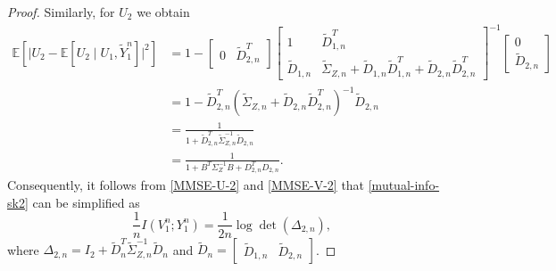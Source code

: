 \documentclass[12pt]{article}
\newcommand{\E}{\mathbb{E}}
\begin{document}
\begin{proof}
Similarly, for $U_2$ we obtain
\begin{equation}\label{MMSE-V-2}
\begin{aligned}
\E[\vert U_2-\E[U_2\mid U_1, \widetilde{Y}_1^n]\vert^2] &= 1 - \begin{bmatrix}0 & \widetilde{D}^T_{2,n}\end{bmatrix} \begin{bmatrix}1 & \widetilde{D}_{1,n}^T\\[2pt] \widetilde{D}_{1,n} & \widetilde{\Sigma}_{Z,n}+\widetilde{D}_{1,n}\widetilde{D}_{1,n}^T+\widetilde{D}_{2,n}\widetilde{D}_{2,n}^T\end{bmatrix}^{-1} \begin{bmatrix}
   0\\ \widetilde{D}_{2,n}
\end{bmatrix}        \\
&= 1 -   \widetilde{D}_{2,n}^T(\widetilde{\Sigma}_{Z,n}+\widetilde{D}_{2,n}\widetilde{D}_{2,n}^T)^{-1}\widetilde{D}_{2,n}         \\
&=\frac{1}{1+\widetilde{D}_{2,n}^T\widetilde{\Sigma}_{Z,n}^{-1}\widetilde{D}_{2,n}}\\
&=\frac{1}{1+B^T\Sigma_Z^{-1}B+D^T_{2,n}D_{2,n}}.
\end{aligned}
\end{equation}
Consequently, it follows from \eqref{MMSE-U-2} and \eqref{MMSE-V-2} that \eqref{mutual-info-sk2} can be simplified as
\begin{equation}\label{pf-sk2-mutual-info}
   \frac{1}{n}I(V_1^n;Y_1^n)= \frac{1}{2n}\log \det(\Delta_{2,n}),
\end{equation}
where $\Delta_{2,n}=I_2 +\widetilde{D}_n^T\widetilde{\Sigma}_{Z,n}^{-1}\widetilde{D}_n$ and $\widetilde{D}_n =\begin{bmatrix}\widetilde{D}_{1,n} & \widetilde{D}_{2,n}\end{bmatrix}$.


\end{proof}
\end{document}
